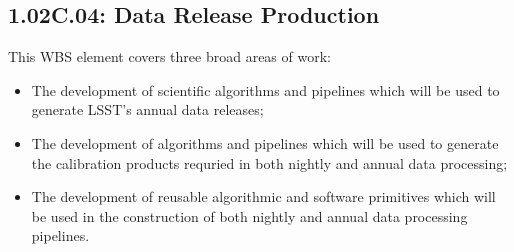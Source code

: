 \subsection{1.02C.04: Data Release Production}

This WBS element covers three broad areas of work:

\begin{itemize}

  \item{The development of scientific algorithms and pipelines which will be
  used to generate LSST's annual data releases;}

  \item{The development of algorithms and pipelines which will be used to
  generate the calibration products requried in both nightly and annual data
  processing;}

  \item{The development of reusable algorithmic and software primitives which
  will be used in the construction of both nightly and annual data processing
  pipelines.}

\end{itemize}
